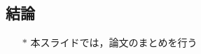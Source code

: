 \documentclass[dvipdfmx, 10.5pt]{beamer}
\begin{document}

\subsection{結論}

\begin{frame}{\insertsubsection}
	\begin{itemize}
		\item[$\ast$] 本スライドでは，論文のまとめを行う
	\end{itemize}

\end{frame}




\end{document}
